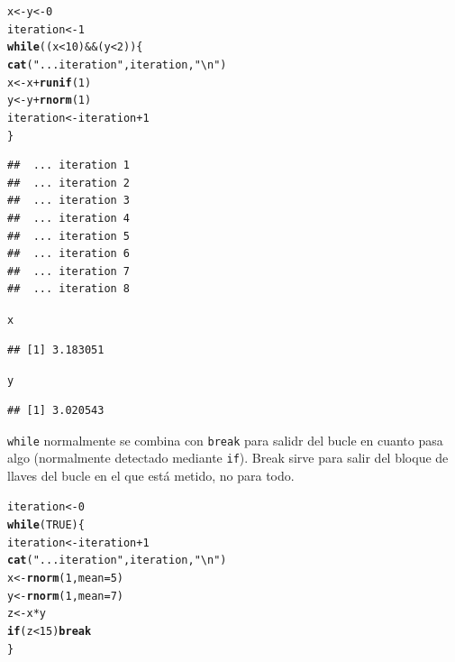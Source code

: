 \documentclass{config/apuntes}\usepackage[]{graphicx}\usepackage[]{xcolor}
\makeatletter
\newcommand{\hlnum}[1]{\textcolor[rgb]{0.686,0.059,0.569}{#1}}%
\newcommand{\hlsng}[1]{\textcolor[rgb]{0.192,0.494,0.8}{#1}}%
\newcommand{\hlopt}[1]{\textcolor[rgb]{0,0,0}{#1}}%
\newcommand{\hldef}[1]{\textcolor[rgb]{0.345,0.345,0.345}{#1}}%
\newcommand{\hlkwa}[1]{\textcolor[rgb]{0.161,0.373,0.58}{\textbf{#1}}}%
\newcommand{\hlkwb}[1]{\textcolor[rgb]{0.69,0.353,0.396}{#1}}%
\newcommand{\hlkwc}[1]{\textcolor[rgb]{0.333,0.667,0.333}{#1}}%
\newcommand{\hlkwd}[1]{\textcolor[rgb]{0.737,0.353,0.396}{\textbf{#1}}}%
\newenvironment{kframe}{%
 \def\at@end@of@kframe{}%
 \ifinner\ifhmode%
  \def\at@end@of@kframe{\end{minipage}}%
  \begin{minipage}{\columnwidth}%
 \fi\fi%
 \def\FrameCommand##1{\hskip\@totalleftmargin \hskip-\fboxsep
 \colorbox{shadecolor}{##1}\hskip-\fboxsep
     \hskip-\linewidth \hskip-\@totalleftmargin \hskip\columnwidth}%
 \MakeFramed {\advance\hsize-\width
   \@totalleftmargin\z@ \linewidth\hsize
   \@setminipage}}%
 {\par\unskip\endMakeFramed%
 \at@end@of@kframe}
\newenvironment{knitrout}{}{} %
\newcommand{\code}[1]{\texttt{#1}}
\makeatother
\begin{document}
\begin{knitrout}
\color{fgcolor}\begin{kframe}
\begin{alltt}
\hldef{x} \hlkwb{<-} \hldef{y} \hlkwb{<-} \hlnum{0}
\hldef{iteration} \hlkwb{<-} \hlnum{1}
\hlkwa{while}\hldef{( (x} \hlopt{<} \hlnum{10}\hldef{)} \hlopt{&&} \hldef{(y} \hlopt{<} \hlnum{2}\hldef{)) \{}
  \hlkwd{cat}\hldef{(}\hlsng{" ... iteration"}\hldef{, iteration,} \hlsng{"\textbackslash{}n"}\hldef{)}
  \hldef{x} \hlkwb{<-} \hldef{x} \hlopt{+} \hlkwd{runif}\hldef{(}\hlnum{1}\hldef{)}
  \hldef{y} \hlkwb{<-} \hldef{y} \hlopt{+} \hlkwd{rnorm}\hldef{(}\hlnum{1}\hldef{)}
  \hldef{iteration} \hlkwb{<-} \hldef{iteration} \hlopt{+} \hlnum{1}
\hldef{\}}
\end{alltt}
\begin{verbatim}
##  ... iteration 1 
##  ... iteration 2 
##  ... iteration 3 
##  ... iteration 4 
##  ... iteration 5 
##  ... iteration 6 
##  ... iteration 7 
##  ... iteration 8
\end{verbatim}
\begin{alltt}
\hldef{x}
\end{alltt}
\begin{verbatim}
## [1] 3.183051
\end{verbatim}
\begin{alltt}
\hldef{y}
\end{alltt}
\begin{verbatim}
## [1] 3.020543
\end{verbatim}
\end{kframe}
\end{knitrout}

\code{while} normalmente se combina con \code{break} para salidr del bucle en cuanto pasa algo (normalmente detectado mediante \code{if}). Break sirve para salir del bloque de llaves del bucle en el que está metido, no para todo. 

\begin{knitrout}
\color{fgcolor}\begin{kframe}
\begin{alltt}
\hldef{iteration} \hlkwb{<-} \hlnum{0}
\hlkwa{while}\hldef{(}\hlnum{TRUE}\hldef{) \{}
  \hldef{iteration} \hlkwb{<-} \hldef{iteration} \hlopt{+} \hlnum{1}
  \hlkwd{cat}\hldef{(}\hlsng{" ... iteration"}\hldef{, iteration,} \hlsng{"\textbackslash{}n"}\hldef{)}
  \hldef{x} \hlkwb{<-} \hlkwd{rnorm}\hldef{(}\hlnum{1}\hldef{,} \hlkwc{mean} \hldef{=} \hlnum{5}\hldef{)}
  \hldef{y} \hlkwb{<-} \hlkwd{rnorm}\hldef{(}\hlnum{1}\hldef{,} \hlkwc{mean} \hldef{=} \hlnum{7}\hldef{)}
  \hldef{z} \hlkwb{<-} \hldef{x} \hlopt{*} \hldef{y}
  \hlkwa{if} \hldef{(z} \hlopt{<} \hlnum{15}\hldef{)} \hlkwa{break}
\hldef{\}}
\end{alltt}
\end{kframe}
\end{knitrout}
\end{document}
